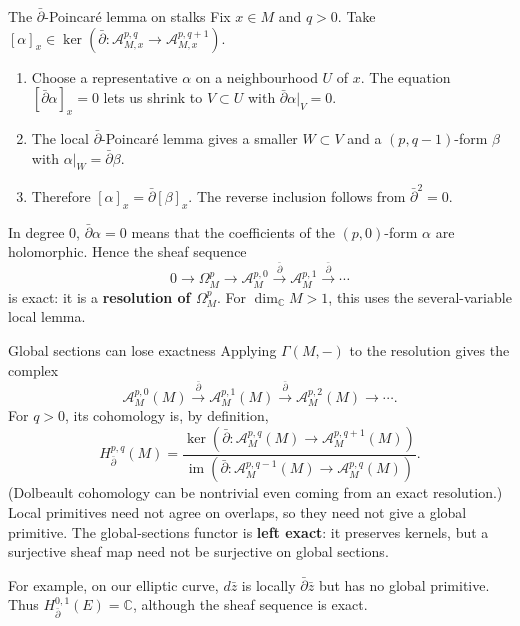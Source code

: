 \documentclass[aspectratio=169,11pt]{beamer}
\newcommand{\db}{\bar\partial}
\newcommand{\C}{\mathbb C}
\newcommand{\A}{\mathcal A}
\begin{document}
\begin{frame}{The $\db$-Poincar\'e lemma on stalks}
Fix $x\in M$ and $q>0$. Take
$[\alpha]_x\in\ker(\db:\A^{p,q}_{M,x}\to\A^{p,q+1}_{M,x})$.
\begin{enumerate}
\item Choose a representative $\alpha$ on a neighbourhood $U$ of $x$.
The equation $[\db\alpha]_x=0$ lets us shrink to $V\subset U$ with
$\db\alpha|_V=0$.
\item The local $\db$-Poincar\'e lemma gives a smaller
$W\subset V$ and a $(p,q-1)$-form $\beta$ with
$\alpha|_W=\db\beta$.
\item Therefore $[\alpha]_x=\db[\beta]_x$.
The reverse inclusion follows from $\db^2=0$.
\end{enumerate}
In degree $0$, $\db\alpha=0$ means that the coefficients of the
$(p,0)$-form $\alpha$ are holomorphic. Hence the sheaf sequence
\[
 0\longrightarrow\Omega^p_M\longrightarrow\A^{p,0}_M
 \xrightarrow{\db}\A^{p,1}_M\xrightarrow{\db}\cdots
\]
is exact: it is a \textbf{resolution of $\Omega^p_M$}.
For $\dim_{\C}M>1$, this uses the several-variable local lemma.
\end{frame}

\begin{frame}{Global sections can lose exactness}
Applying $\Gamma(M,-)$ to the resolution gives the complex
\[
 \A^{p,0}_M(M)\xrightarrow{\db}\A^{p,1}_M(M)
 \xrightarrow{\db}\A^{p,2}_M(M)\longrightarrow\cdots.
\]
For $q>0$, its cohomology is, by definition,
\[
 H^{p,q}_{\db}(M)=
 \frac{\ker(\db:\A^{p,q}_M(M)\to\A^{p,q+1}_M(M))}
 {\operatorname{im}(\db:\A^{p,q-1}_M(M)\to\A^{p,q}_M(M))}.
\]
(Dolbeault cohomology can be nontrivial even coming from an exact
resolution.) Local primitives need not agree on overlaps, so they need not give
a global primitive. The global-sections functor is \textbf{left exact}:
it preserves kernels, but a surjective sheaf map need not be
surjective on global sections.

For example, on our elliptic curve, $d\bar z$ is locally $\db\bar z$
but has no global primitive. Thus $H^{0,1}_{\db}(E)=\C$,
although the sheaf sequence is exact.
\end{frame}
\end{document}
